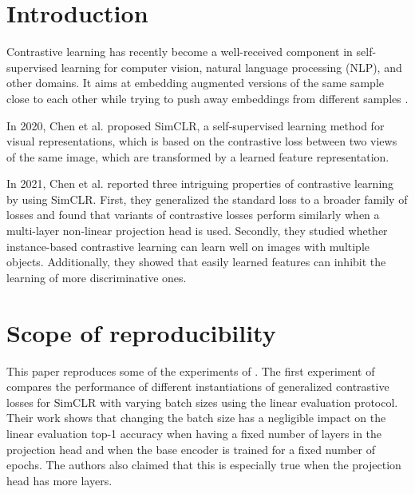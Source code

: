 \section{Introduction}

Contrastive learning has recently become a well-received component in self-supervised learning for computer vision, natural language processing (NLP), and other domains. It aims at embedding augmented versions of the same sample close to each other while trying to push away embeddings from different samples \cite{jaiswal2020survey}.


In 2020, Chen et al. \cite{simclr} proposed SimCLR, a self-supervised learning method for visual representations, which is based on the contrastive loss between two views of the same image, which are transformed by a learned feature representation. 
    
In 2021, Chen et al. \cite{chen2021intriguing} reported three intriguing properties of contrastive learning by using SimCLR. First, they generalized the standard loss to a broader family of losses and found that variants of contrastive losses perform similarly when a multi-layer non-linear projection head is used. Secondly, they studied whether instance-based contrastive learning can learn well on images with multiple objects. 
    Additionally, they showed that easily learned features can inhibit the learning of more discriminative ones.


\section{Scope of reproducibility}
\label{section:scope_of_reproducibility} 
    This paper reproduces some of the experiments of \cite{chen2021intriguing}. The first experiment of \cite{chen2021intriguing} compares the performance of different instantiations of generalized contrastive losses for SimCLR with varying batch sizes using the linear evaluation protocol. Their work shows that changing the batch size has a negligible impact on the linear evaluation top-1 accuracy when having a fixed number of layers in the projection head and when the base encoder is trained for a fixed number of epochs. The authors also claimed that this is especially true when the projection head has more layers.
    
